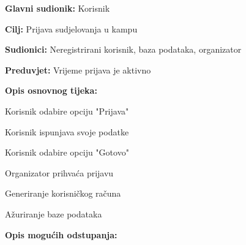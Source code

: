 					\noindent {}
					\begin{packed_item}
						
						\item \textbf{Glavni sudionik: } Korisnik
						\item  \textbf{Cilj:} Prijava sudjelovanja u kampu
						\item  \textbf{Sudionici:} Neregistrirani korisnik, baza podataka, organizator
						\item  \textbf{Preduvjet:} Vrijeme prijava je aktivno
						\item  \textbf{Opis osnovnog tijeka:} 
						
						\item[] \begin{packed_enum}
							
							\item Korisnik odabire opciju "Prijava"
							\item Korisnik ispunjava svoje podatke
							\item Korisnik odabire opciju "Gotovo"
							\item Organizator prihvaća prijavu
							\item Generiranje korisničkog računa
							\item Ažuriranje baze podataka
							
						\end{packed_enum}
						
						\item  \textbf{Opis mogućih odstupanja:}
						
						\item[] 
					\end{packed_item}
					
